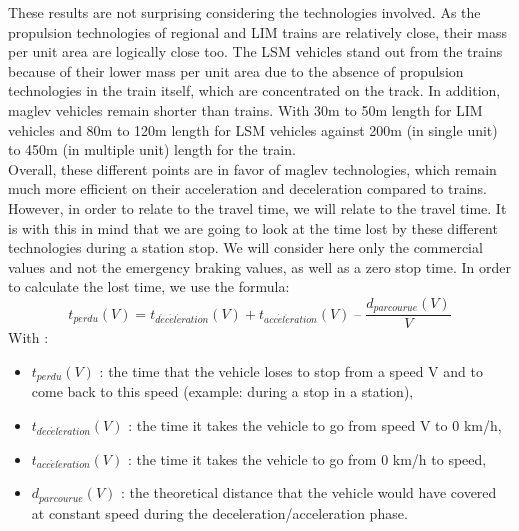 \documentclass[12pt, a4paper, onecolumn]{article}
\renewcommand{\tab}{\tabto{15px}}
\begin{document}
\tab These results are not surprising considering the technologies involved.
As the propulsion technologies of regional and LIM trains are relatively close, their mass per unit area are logically close too.
The LSM vehicles stand out from the trains because of their lower mass per unit area due to the absence of propulsion technologies in the train itself, which are concentrated on the track.
In addition, maglev vehicles remain shorter than trains.
With 30m to 50m length for LIM vehicles and 80m to 120m length for LSM vehicles against 200m (in single unit) to 450m (in multiple unit) length for the train. \\
\linebreak
\tab Overall, these different points are in favor of maglev technologies, which remain much more efficient on their acceleration and deceleration compared to trains. \\
\tab However, in order to relate to the travel time, we will relate to the travel time.
It is with this in mind that we are going to look at the time lost by these different technologies during a station stop.
We will consider here only the commercial values and not the emergency braking values, as well as a zero stop time.
In order to calculate the lost time, we use the formula: \\
$$t_{perdu}(V) = t_{d\acute{e}c\acute{e}l\acute{e}ration}(V) + t_{acc\acute{e}l\acute{e}ration}(V) \; – \; \frac{d_{parcourue}(V)}{V}$$
\noindent With :
\begin{itemize}
  \item $t_{perdu}(V)$ : the time that the vehicle loses to stop from a speed V and to come back to this speed (example: during a stop in a station),
  \item $t_{d\acute{e}c\acute{e}l\acute{e}ration}(V)$ : the time it takes the vehicle to go from speed V to 0 km/h,
  \item $t_{acc\acute{e}l\acute{e}ration}(V)$ : the time it takes the vehicle to go from 0 km/h to speed,
  \item $d_{parcourue}(V)$ : the theoretical distance that the vehicle would have covered at constant speed during the deceleration/acceleration phase.
\end{itemize}
\end{document}
